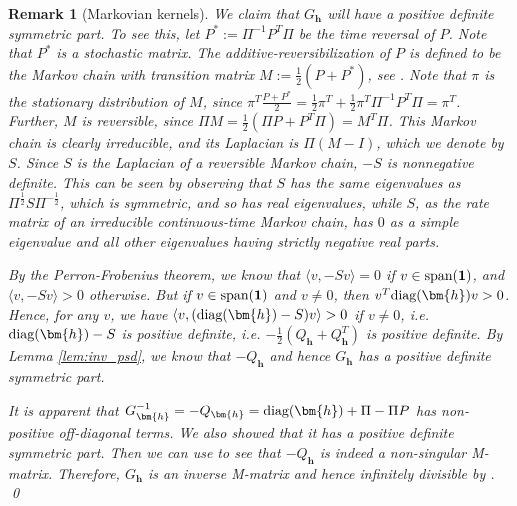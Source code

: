 \documentclass[a4paper, 11pt]{article}
\newcommand{\ind}{\mathbf{1}}
\newcommand{\diag}{\textnormal{diag}}
\newtheorem{rem}{Remark}[thm]
\begin{document}
\begin{rem}[Markovian kernels]
We claim that $G_{\bm{h}}$ will have a positive definite symmetric part.
To see this, let $P^* := \Pi^{-1} P^T \Pi$
be the time reversal of $P$. Note that $P^*$ is a stochastic matrix. The additive-reversibilization of $P$ is defined to be the Markov chain with transition matrix $M := \frac{1}{2}(P + P^*)$, see
\cite[Lemma 9.20]{aldous-fill}.
Note that $\pi$ is the stationary distribution of $M$, since $\pi^T \frac{P + P^*}{2} = \frac{1}{2} \pi^T + \frac{1}{2} \pi^T \Pi^{-1} P^T \Pi = \pi^T$. Further, $M$ is reversible, since $\Pi M = \frac{1}{2} (\Pi P  + P^T \Pi) = M^T \Pi$.
This Markov chain is clearly irreducible, and its Laplacian is $\Pi (M-I)$,
which we denote by $S$. Since $S$ is the Laplacian of
a reversible Markov chain, $-S$ is nonnegative definite. This can be seen by observing that $S$ has the same eigenvalues as $\Pi^{\frac{1}{2}} S \Pi^{- \frac{1}{2}}$, which is symmetric, and so has real eigenvalues, while $S$, as the rate matrix of an irreducible continuous-time Markov chain, has $0$ as a simple eigenvalue and all other eigenvalues having strictly negative real parts.


By the Perron-Frobenius theorem, we know that $\langle v,-Sv\rangle=0$ if $v\in\textnormal{span}(\ind)$, and $\langle v,-Sv\rangle > 0$ otherwise. But if $v\in\textnormal{span}(\ind)$ and $v\neq 0$, then $v^T \diag(\bm{h}) v > 0$. Hence, for any $v$, we have $\langle v, (\diag(\bm{h})-S)v\rangle>0$ if $v\neq 0$, i.e. $\diag(\bm{h})-S$ is positive definite, i.e. $- \frac{1}{2}( Q_{\bm{h}} + Q_{\bm{h}}^T)$ is positive definite. By Lemma \ref{lem:inv_psd}, we know that $-Q_{\bm{h}}$ and hence $G_{\bm{h}}$ has a positive definite symmetric part.

It is apparent that $G_{\bm{h}}^{-1}=-Q_{\bm{h}}=\diag(\bm{h})+\Pi-\Pi  P$ has non-positive off-diagonal terms. We also showed that it has a positive definite symmetric part. Then we can use \cite[Condition $I_{26}$]{plemmons77} to see that $-Q_{\bm{h}}$ is indeed a non-singular M-matrix. Therefore, $G_{\bm{h}}$ is an inverse M-matrix and hence infinitely divisible by \cite[Lemma 4.2]{ek09}.
\qed

\end{rem}
\end{document}
